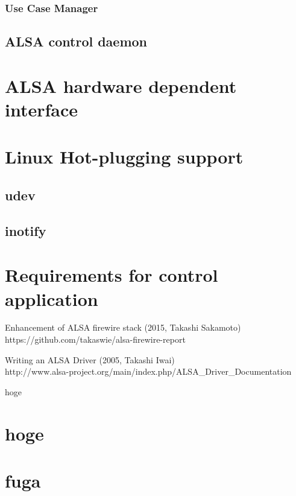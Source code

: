 \documentclass[onecolumn]{article}
\begin{document}
\subsubsection{Use Case Manager}

\subsection{ALSA control daemon}

\section{ALSA hardware dependent interface}

\section{Linux Hot-plugging support}

\subsection{udev}

\subsection{inotify}

\section{Requirements for control application}

\newpage

\begin{thebibliography}{99}


Enhancement of ALSA firewire stack (2015, Takashi Sakamoto) \\
https://github.com/takaswie/alsa-firewire-report

Writing an ALSA Driver (2005, Takashi Iwai) \\
http://www.alsa-project.org/main/index.php/ALSA\_Driver\_Documentation

hoge

\end{thebibliography}

\newpage

\appendix


\section{hoge}

\section{fuga}
\end{document}
